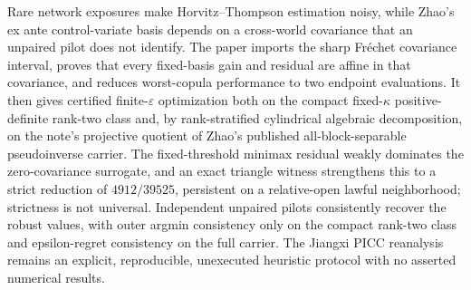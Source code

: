 Rare network exposures make Horvitz--Thompson estimation noisy, while Zhao's ex ante control-variate basis depends on a cross-world covariance that an unpaired pilot does not identify.  The paper imports the sharp Fr\'echet covariance interval, proves that every fixed-basis gain and residual are affine in that covariance, and reduces worst-copula performance to two endpoint evaluations.  It then gives certified finite-\(\varepsilon\) optimization both on the compact fixed-\(\kappa\) positive-definite rank-two class and, by rank-stratified cylindrical algebraic decomposition, on the note's projective quotient of Zhao's published all-block-separable pseudoinverse carrier.  The fixed-threshold minimax residual weakly dominates the zero-covariance surrogate, and an exact triangle witness strengthens this to a strict reduction of \(4912/39525\), persistent on a relative-open lawful neighborhood; strictness is not universal.  Independent unpaired pilots consistently recover the robust values, with outer argmin consistency only on the compact rank-two class and epsilon-regret consistency on the full carrier.  The Jiangxi PICC reanalysis remains an explicit, reproducible, unexecuted heuristic protocol with no asserted numerical results.
